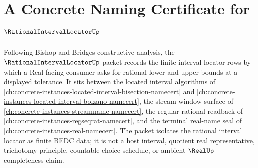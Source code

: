 \chapter{A Concrete Naming Certificate for $\RationalIntervalLocatorUp$}
\label{ch:concrete-instances-rational-interval-locator-namecert}

Following Bishop and Bridges constructive analysis, the $\RationalIntervalLocatorUp$ packet records the finite interval-locator rows by which a Real-facing consumer asks for rational lower and upper bounds at a displayed tolerance. It sits between the located interval algorithms of \autoref{ch:concrete-instances-located-interval-bisection-namecert} and \autoref{ch:concrete-instances-located-interval-bolzano-namecert}, the stream-window surface of \autoref{ch:concrete-instances-streamname-namecert}, the regular rational readback of \autoref{ch:concrete-instances-regseqrat-namecert}, and the terminal real-name seal of \autoref{ch:concrete-instances-real-namecert}. The packet isolates the rational interval locator as finite BEDC data; it is not a host interval, quotient real representative, trichotomy principle, countable-choice schedule, or ambient $\RealUp$ completeness claim.

